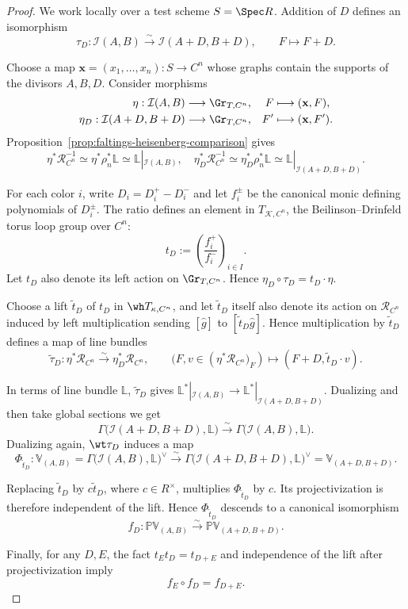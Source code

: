 \documentclass{amsart}
\numberwithin{equation}{section}
\numberwithin{figure}{section}
\theoremstyle{definition}
\theoremstyle{remark}
\renewcommand{\c}[1]{\mathcal{#1}}
\renewcommand{\b}[1]{\mathbb{#1}}
\begin{document}
\begin{proof}
	
	We work locally over a test scheme $S=\Spec R$.
 Addition of $D$ defines an isomorphism
	\[
	\tau_D:\c I(A,B)
	\xrightarrow{\sim}
	\c I(A+D,B+D),
	\qquad F\longmapsto F+D.
	\]
	
	Choose a map $\mathbf x=(x_1,\ldots,x_n):S\to C^n$
	whose graphs contain the supports of the divisors $A,B,D$. Consider morphisms
	\[
	\begin{aligned}
		\eta:\c I(A,B)&\longrightarrow\Gr_{T,C^n},
		&F&\longmapsto(\mathbf x,F),\\
		\eta_D:\c I(A+D,B+D)
		&\longrightarrow\Gr_{T,C^n},
		&F'&\longmapsto(\mathbf x,F').
	\end{aligned}
	\]
		Proposition~\ref{prop:faltings-heisenberg-comparison}
	gives
$$\eta^*\c R_{C^n}^{-1}
\simeq \eta^*\rho_n^*\b L
\simeq \b L|_{\c I(A,B)},\quad 
\eta_D	^*\c R_{C^n}^{-1}
\simeq \eta_D^*\rho_n^*\b L
\simeq \b L|_{\c I(A+D,B+D)}.$$
	
	For each color $i$, write $D_i=D_i^+-D_i^-$ and let
	$f_i^\pm$ be the canonical monic defining polynomials of $D_i^\pm$.
	The ratio defines an element in $T_{\c K,C^n}$,  the Beilinson--Drinfeld
	torus loop group over $C^n$: 
	\[
	t_D
	:=\left(\frac{f_i^+}{f_i^-}\right)_{i\in I}.
	\]
	Let $t_D$ also denote its left action on $\Gr_{T,C^n}$. Hence $\eta_{D}\circ\tau_D
	=t_D\cdot\eta.$
	
Choose a lift $\widetilde t_D$ of $t_D$ in $\wh T_{\kappa,C^n}$, and let
$\widetilde t_D$ itself also denote its action on $\c R_{C^n}$
induced by left multiplication sending $[\widehat g]$
to $[\widetilde t_D\widehat g]$.
Hence multiplication by $\widetilde t_D$ defines a
map of line bundles
\[
\widetilde\tau_D:
\eta^*\c R_{C^n}
\xrightarrow{\sim}
\eta_D^*\c R_{C^n},
\qquad
(F,v\in \left( \eta^*\c R_{C^n})_F\right) \mapsto
(F+D,\widetilde t_D\cdot v).
\]

In terms of line bundle $\b L$, $\widetilde\tau_D$ gives $\b L^*|_{\c I(A,B)}\to \b L^*|_{\c I(A+D,B+D)}$. Dualizing and then take global sections we get
$$\Gamma\bigl(\c I(A+D,B+D),\b L\bigr)
\xrightarrow{\sim}
\Gamma\bigl(\c I(A,B),\b L\bigr).$$
Dualizing again, $\wt \tau_D$ induces a map
\[
\Phi_{\widetilde t_D}:
\b V_{(A,B)}
=\Gamma\bigl(\c I(A,B),\b L\bigr)^\vee
\xrightarrow{\sim}
\Gamma\bigl(\c I(A+D,B+D),\b L\bigr)^\vee
=\b V_{(A+D,B+D)}.
\]

Replacing $\widetilde t_D$ by $c\widetilde t_D$,
	where $c\in R^\times$, multiplies
	$\Phi_{\widetilde t_D}$ by $c$.
	Its projectivization is therefore independent of the
	lift. Hence $\Phi_{\widetilde t_D}$ descends to a canonical isomorphism
	\[
	f_D:\b P\b V_{(A,B)}
	\xrightarrow{\sim}
	\b P\b V_{(A+D,B+D)}.
	\]	
	
Finally, for any $D,E$, the fact $t_Et_D=t_{D+E}$
and independence of the lift after projectivization imply
\[	f_E\circ f_D=f_{D+E}.\]
\end{proof}
\end{document}
